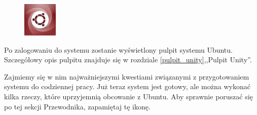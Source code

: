 \begin{figure}
	\includegraphics[width=\linewidth]{images/ikony_dash.png}
\end{figure}

Po zalogowaniu do systemu zostanie wyświetlony pulpit systemu Ubuntu. Szczegółowy opis pulpitu znajduje się w rozdziale \ref{pulpit_unity},,Pulpit Unity''.

Zajmiemy się w nim najważniejszymi kwestiami związanymi z przygotowaniem systemu do codziennej pracy. Już teraz system jest gotowy, ale można wykonać kilka rzeczy, które uprzyjemnią obcowanie z Ubuntu. Aby sprawnie poruszać się po tej sekcji Przewodnika, zapamiętaj tę ikonę.
